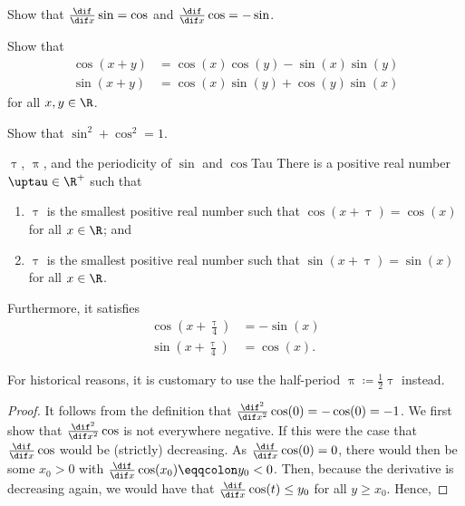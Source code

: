 \begin{exr}{}{}
Show that $\frac{\dif}{\dif x}\sin =\cos$ and $\frac{\dif}{\dif x}\cos =-\sin$.
\end{exr}
\begin{exr}{}{}
Show that
\begin{equation}
\begin{aligned}
\cos (x+y) & =\cos (x)\cos (y)-\sin (x)\sin (y) \\
\sin (x+y) & =\cos (x)\sin (y)+\cos (y)\sin (x)
\end{aligned}
\end{equation}
for all $x,y\in \R$.
\end{exr}
\begin{exr}{}{}
Show that $\sin ^2+\cos ^2=1$.
\end{exr}
\begin{prp}{$\uptau$, $\uppi$, and the periodicity of $\sin$ and $\cos$}{Tau}
There is a positive real number $\uptau \in \R ^+$\index[notation]{$\uptau$} such that
\begin{enumerate}
\item $\uptau$ is the smallest positive real number such that $\cos (x+\uptau )=\cos (x)$ for all $x\in \R$; and
\item $\uptau$ is the smallest positive real number such that $\sin (x+\uptau )=\sin (x)$ for all $x\in \R$.
\end{enumerate}
Furthermore, it satisfies
\begin{equation}
\begin{aligned}
\cos \left( x+\tfrac{\uptau}{4}\right) & =-\sin (x) \\
\sin \left( x+\tfrac{\uptau}{4}\right) & =\cos (x).
\end{aligned}
\end{equation}
\begin{rmk}
For historical reasons, it is customary to use the half-period $\uppi \coloneqq \frac{1}{2}\uptau$\index[notation]{$\uppi$} instead.
\end{rmk}
\begin{proof}
It follows from the definition that $\frac{\dif ^2}{\dif x^2}\cos (0)=-\cos (0)=-1$.  We first show that $\frac{\dif ^2}{\dif x^2}\cos$ is not everywhere negative.  If this were the case that $\frac{\dif}{\dif x}\cos$ would be (strictly) decreasing.  As $\frac{\dif}{\dif x}\cos (0)=0$, there would then be some $x_0>0$ with $\frac{\dif}{\dif x}\cos (x_0)\eqqcolon y_0<0$.  Then, because the derivative is decreasing again, we would have that $\frac{\dif}{\dif x}\cos (t)\leq y_0$ for all $y\geq x_0$.  Hence,

\end{proof}
\end{prp}
